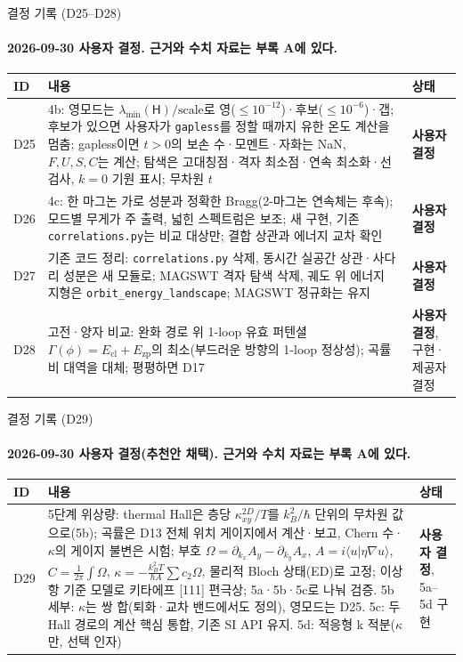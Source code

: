 \begin{frame}[label=decisions-stage4]{결정 기록 (D25--D28)}
  \framesubtitle{2026-09-30 사용자 결정. 근거와 수치 자료는 부록 A에 있다.}
  \small\renewcommand{\arraystretch}{1.12}
  \begin{tabularx}{\textwidth}{@{}p{0.7cm}YP{2.5cm}@{}}
    \toprule
    ID & 내용 & 상태 \\
    \midrule
    D25 & 4b: 영모드는 $\lambda_{\min}(\mathsf H)/\text{scale}$로 영($\le10^{-12}$)·후보($\le10^{-6}$)·갭; 후보가 있으면 사용자가 \texttt{gapless}를 정할 때까지 유한 온도 계산을 멈춤; gapless이면 $t>0$의 보손 수·모멘트·자화는 NaN, $F,U,S,C$는 계산; 탐색은 고대칭점·격자 최소점·연속 최소화·선 검사, $k=0$ 기원 표시; 무차원 $t$ & \textbf{사용자 결정} \\
    D26 & 4c: 한 마그논 가로 성분과 정확한 Bragg(2-마그논 연속체는 후속); 모드별 무게가 주 출력, 넓힌 스펙트럼은 보조; 새 구현, 기존 \texttt{correlations.py}는 비교 대상만; 결합 상관과 에너지 교차 확인 & \textbf{사용자 결정} \\
    D27 & 기존 코드 정리: \texttt{correlations.py} 삭제, 동시간 실공간 상관·사다리 성분은 새 모듈로; MAGSWT 격자 탐색 삭제, 궤도 위 에너지 지형은 \texttt{orbit\_energy\_landscape}; MAGSWT 정규화는 유지 & \textbf{사용자 결정} \\
    D28 & 고전·양자 비교: 완화 경로 위 1-loop 유효 퍼텐셜 $\Gamma(\phi)=E_{\mathrm{cl}}+E_{\mathrm{zp}}$의 최소(부드러운 방향의 1-loop 정상성); 곡률 비 대역을 대체; 평평하면 D17 & \textbf{사용자 결정}, 구현·제공자 결정 \\
    \bottomrule
  \end{tabularx}
\end{frame}

\begin{frame}[label=decisions-stage5]{결정 기록 (D29)}
  \framesubtitle{2026-09-30 사용자 결정(추천안 채택). 근거와 수치 자료는 부록 A에 있다.}
  \small\renewcommand{\arraystretch}{1.12}
  \begin{tabularx}{\textwidth}{@{}p{0.7cm}YP{2.5cm}@{}}
    \toprule
    ID & 내용 & 상태 \\
    \midrule
    D29 & 5단계 위상량: thermal Hall은 층당 $\kappa_{xy}^{2D}/T$를 $k_B^2/\hbar$ 단위의 무차원 값으로(5b); 곡률은 D13 전체 위치 게이지에서 계산·보고, Chern 수·$\kappa$의 게이지 불변은 시험; 부호 $\Omega=\partial_{k_x}A_y-\partial_{k_y}A_x$, $A=i\langle u|\eta\nabla u\rangle$, $C=\frac{1}{2\pi}\int\Omega$, $\kappa=-\frac{k_B^2T}{\hbar A}\sum c_2\Omega$, 물리적 Bloch 상태(ED)로 고정; 이상항 기준 모델로 키타에프 [111] 편극상; 5a·5b·5c로 나눠 검증. 5b 세부: $\kappa$는 쌍 합(퇴화·교차 밴드에서도 정의), 영모드는 D25. 5c: 두 Hall 경로의 계산 핵심 통합, 기존 SI API 유지. 5d: 적응형 k 적분($\kappa$만, 선택 인자) & \textbf{사용자 결정}, 5a--5d 구현 \\
    \bottomrule
  \end{tabularx}
\end{frame}


